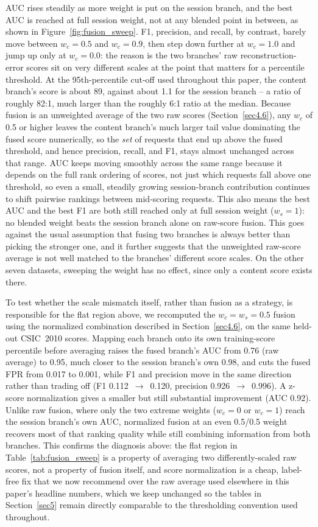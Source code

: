 \documentclass[futureinternet,article,submit,moreauthors]{Definitions/mdpi}
\begin{document}
AUC rises steadily as more weight is put on the session branch, and the best AUC is reached at full session weight, not at any blended point in between, as shown in Figure~\ref{fig:fusion_sweep}. F1, precision, and recall, by contrast, barely move between $w_c=0.5$ and $w_c=0.9$, then step down further at $w_c=1.0$ and jump up only at $w_c=0.0$: the reason is the two branches' raw reconstruction-error scores sit on very different scales at the point that matters for a percentile threshold. At the 95th-percentile cut-off used throughout this paper, the content branch's score is about 89, against about 1.1 for the session branch -- a ratio of roughly 82:1, much larger than the roughly 6:1 ratio at the median. Because fusion is an unweighted average of the two raw scores (Section~\ref{sec4.6}), any $w_c$ of 0.5 or higher leaves the content branch's much larger tail value dominating the fused score numerically, so the \emph{set} of requests that end up above the fused threshold, and hence precision, recall, and F1, stays almost unchanged across that range. AUC keeps moving smoothly across the same range because it depends on the full rank ordering of scores, not just which requests fall above one threshold, so even a small, steadily growing session-branch contribution continues to shift pairwise rankings between mid-scoring requests. This also means the best AUC and the best F1 are both still reached only at full session weight ($w_s=1$): no blended weight beats the session branch alone on raw-score fusion. This goes against the usual assumption that fusing two branches is always better than picking the stronger one, and it further suggests that the unweighted raw-score average is not well matched to the branches' different score scales. On the other seven datasets, sweeping the weight has no effect, since only a content score exists there.

To test whether the scale mismatch itself, rather than fusion as a strategy, is responsible for the flat region above, we recomputed the $w_c=w_s=0.5$ fusion using the normalized combination described in Section~\ref{sec4.6}, on the same held-out CSIC~2010 scores. Mapping each branch onto its own training-score percentile before averaging raises the fused branch's AUC from 0.76 (raw average) to 0.95, much closer to the session branch's own 0.98, and cuts the fused FPR from 0.017 to 0.001, while F1 and precision move in the same direction rather than trading off (F1 0.112~$\rightarrow$~0.120, precision 0.926~$\rightarrow$~0.996). A z-score normalization gives a smaller but still substantial improvement (AUC 0.92). Unlike raw fusion, where only the two extreme weights ($w_c=0$ or $w_c=1$) reach the session branch's own AUC, normalized fusion at an even 0.5/0.5 weight recovers most of that ranking quality while still combining information from both branches. This confirms the diagnosis above: the flat region in Table~\ref{tab:fusion_sweep} is a property of averaging two differently-scaled raw scores, not a property of fusion itself, and score normalization is a cheap, label-free fix that we now recommend over the raw average used elsewhere in this paper's headline numbers, which we keep unchanged so the tables in Section~\ref{sec5} remain directly comparable to the thresholding convention used throughout.
\end{document}
